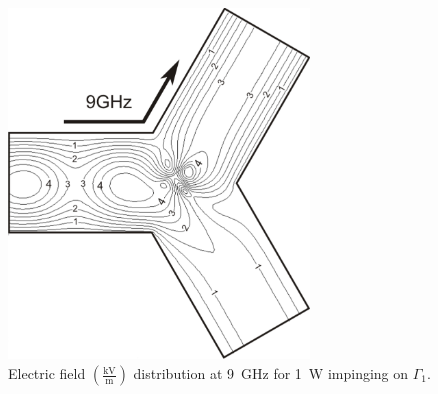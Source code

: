 \begin{figure}[!ht]
\centering
\includegraphics[width=8cm]{linfield}
\caption{Electric field $\left(\frac{\mathrm{kV}}{\mathrm{m}}\right)$ distribution at 9~GHz for 1~W impinging on $\Gamma_1$.}
\label{fig:linfield}
\end{figure}
 
